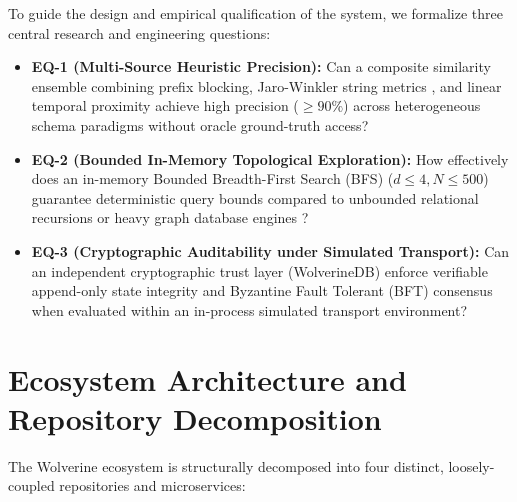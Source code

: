 To guide the design and empirical qualification of the system, we formalize three central research and engineering questions:

\begin{itemize}
    \item \textbf{EQ-1 (Multi-Source Heuristic Precision):} Can a composite similarity ensemble combining prefix blocking, Jaro-Winkler string metrics \cite{jaro1989advances, winkler1990string}, and linear temporal proximity achieve high precision ($\ge 90\%$) across heterogeneous schema paradigms without oracle ground-truth access?
    \item \textbf{EQ-2 (Bounded In-Memory Topological Exploration):} How effectively does an in-memory Bounded Breadth-First Search (BFS) ($d \le 4, N \le 500$) guarantee deterministic query bounds compared to unbounded relational recursions or heavy graph database engines \cite{newman2003structure, cormen2009introduction}?
    \item \textbf{EQ-3 (Cryptographic Auditability under Simulated Transport):} Can an independent cryptographic trust layer (WolverineDB) enforce verifiable append-only state integrity and Byzantine Fault Tolerant (BFT) consensus \cite{castro2002practical, merkle1987digital} when evaluated within an in-process simulated transport environment?
\end{itemize}

\section{Ecosystem Architecture and Repository Decomposition}
\label{sec:design}

The Wolverine ecosystem is structurally decomposed into four distinct, loosely-coupled repositories and microservices:

